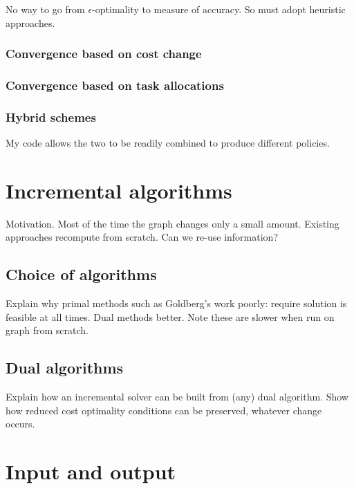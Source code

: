 No way to go from $\epsilon$-optimality to measure of accuracy. So must adopt heuristic approaches.

\subsubsection{Convergence based on cost change}

\subsubsection{Convergence based on task allocations}

\subsubsection{Hybrid schemes}

My code allows the two to be readily combined to produce different policies.

\section{Incremental algorithms} \label{sec:impl-incremental}

Motivation. Most of the time the graph changes only a small amount. Existing approaches recompute from scratch. Can we re-use information?

\subsection{Choice of algorithms}

Explain why primal methods such as Goldberg's work poorly: require solution is feasible at all times. Dual methods better. Note these are slower when run on graph from scratch.

\subsection{Dual algorithms}

Explain how an incremental solver can be built from (any) dual algorithm. Show how reduced cost optimality conditions can be preserved, whatever change occurs.

\section{Input and output}


